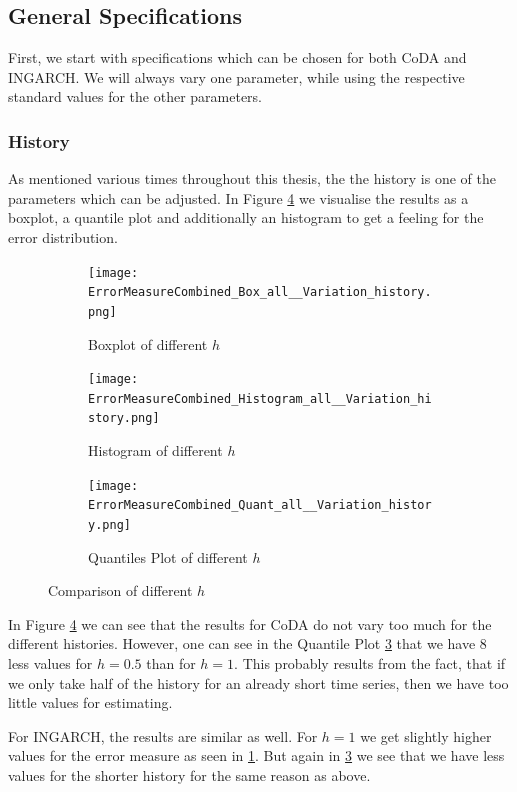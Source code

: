 \subsection{General Specifications}
\label{sec:General Specifications}

First, we start with specifications which can be chosen for both CoDA and INGARCH. We will always vary one parameter, while using the respective standard values for the other parameters. 
\subsubsection{History}
\label{sec:History}

As mentioned various times throughout this thesis, the the history is one of the parameters which can be adjusted. In Figure \ref{fig:History Comp1} we visualise the results as a boxplot, a quantile plot  and additionally an histogram to get a feeling for the error distribution. 

\begin{figure}[htb!]
\centering
\begin{subfigure}[b]{0.45\textwidth}
\texttt{[image: ErrorMeasureCombined\_Box\_all\_\_Variation\_history.png]}
\caption{Boxplot of different $h$}
\label{fig:History Box}
\end{subfigure}
\hfill
\begin{subfigure}[b]{0.45\textwidth}
\texttt{[image: ErrorMeasureCombined\_Histogram\_all\_\_Variation\_history.png]}
\caption{Histogram of different $h$}
\label{fig:History Hist}
\end{subfigure}
\hfill
\begin{subfigure}[b]{0.8\textwidth}
\texttt{[image: ErrorMeasureCombined\_Quant\_all\_\_Variation\_history.png]}
\caption{Quantiles Plot of different $h$}
\label{fig:History Quant}
\end{subfigure}
\caption{Comparison of different $h$}
\label{fig:History Comp1}
\end{figure}

In Figure \ref{fig:History Comp1} we can see that the results for CoDA do not vary too much for the different histories. However, one can see in the Quantile Plot \ref{fig:History Quant} that we have 8 less values for  $h=0.5$ than for $h=1$. This probably results from the fact, that if we only take half of the history for an already short time series, then we have too little values for estimating. 

For INGARCH, the results are similar as well. For $h=1$ we get slightly higher values for the error measure as seen in \ref{fig:History Box}. But again in \ref{fig:History Quant} we see that we have less values for the shorter history for the same reason as above. 

